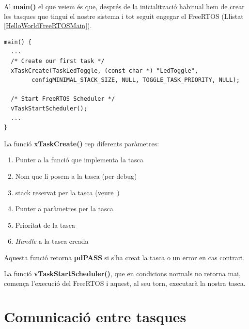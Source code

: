 Al {\bf main()} el que veiem és que, després de la inicialització habitual hem de crear les tasques que tingui el nostre sistema i tot seguit engegar el FreeRTOS (Llistat \ref{HelloWorldFreeRTOSMain}).

\begin{lstlisting}[caption={Main HelloWorld per FreeRTOS},style=customc,label=HelloWorldFreeRTOSMain]
main() {
  ...
  /* Create our first task */
  xTaskCreate(TaskLedToggle, (const char *) "LedToggle",
        configMINIMAL_STACK_SIZE, NULL, TOGGLE_TASK_PRIORITY, NULL);

  /* Start FreeRTOS Scheduler */
  vTaskStartScheduler();
  ...
}
\end{lstlisting}

La funció {\bf xTaskCreate()} rep diferents paràmetres:
\begin{enumerate}
 \item Punter a la funció que implementa la tasca
 \item Nom que li posem a la tasca (per debug)
 \item \gls{stack} reservat per la tasca (veure~)
 \item Punter a paràmetres per la tasca
 \item Prioritat de la tasca
 \item {\em Handle} a la tasca creada
\end{enumerate}

Aquesta funció retorna {\bf pdPASS} si s'ha creat la tasca o un error en cas contrari.

La funció {\bf vTaskStartScheduler()}, que en condicions normals no retorna mai, comença l'execució del FreeRTOS i aquest, al seu torn, executarà la nostra tasca.







\chapter{Comunicació entre tasques}

